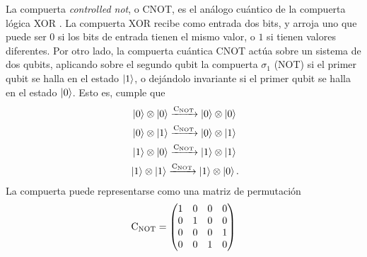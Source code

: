 La compuerta \textit{controlled not}, o CNOT, es el análogo cuántico de la compuerta lógica XOR . La compuerta XOR recibe como entrada dos bits, y arroja uno que puede ser $0$ si los bits de entrada tienen el mismo valor, o $1$ si tienen valores diferentes. Por otro lado, la compuerta cuántica CNOT actúa sobre un sistema de dos qubits, aplicando sobre el segundo qubit la compuerta $\sigma_{1}$ (NOT) si el primer qubit se halla en el estado $\ket{1}$, o dejándolo invariante si el primer qubit se halla en el estado $\ket{0}$. Esto es, cumple que 
\begin{align*}
    \ket{0}\otimes\ket{0}\xrightarrow{\cnot}\ket{0}\otimes\ket{0}\\
    \ket{0}\otimes\ket{1}\xrightarrow{\cnot}\ket{0}\otimes\ket{1}\\
    \ket{1}\otimes\ket{0}\xrightarrow{\cnot}\ket{1}\otimes\ket{1}\\
    \ket{1}\otimes\ket{1}\xrightarrow{\cnot}\ket{1}\otimes\ket{0} \rlap{.}
\end{align*}
La compuerta puede representarse como una matriz de permutación
\begin{equation*}
    \text{C}_{\text{NOT}}=\begin{pmatrix}
        1&0&0&0\\
        0&1&0&0\\
        0&0&0&1\\
        0&0&1&0
    \end{pmatrix}
\end{equation*}

